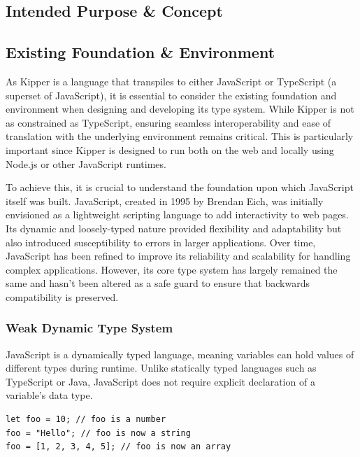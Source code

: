 \subsection{Intended Purpose \& Concept}

\subsection{Existing Foundation \& Environment}

As Kipper is a language that transpiles to either JavaScript or TypeScript (a superset of JavaScript), it is essential to consider the existing foundation and environment when designing and developing its type system. While Kipper is not as constrained as TypeScript, ensuring seamless interoperability and ease of translation with the underlying environment remains critical. This is particularly important since Kipper is designed to run both on the web and locally using Node.js or other JavaScript runtimes.

To achieve this, it is crucial to understand the foundation upon which JavaScript itself was built. JavaScript, created in 1995 by Brendan Eich, was initially envisioned as a lightweight scripting language to add interactivity to web pages. Its dynamic and loosely-typed nature provided flexibility and adaptability but also introduced susceptibility to errors in larger applications. Over time, JavaScript has been refined to improve its reliability and scalability for handling complex applications. However, its core type system has largely remained the same and hasn't been altered as a safe guard to ensure that backwards compatibility is preserved.

\subsubsection{Weak Dynamic Type System}

JavaScript is a dynamically typed language, meaning variables can hold values of different types during runtime. Unlike statically typed languages such as TypeScript or Java, JavaScript does not require explicit declaration of a variable's data type.

\begin{lstlisting}[caption=Holding Values of different Types during Runtime]
let foo = 10; // foo is a number
foo = "Hello"; // foo is now a string
foo = [1, 2, 3, 4, 5]; // foo is now an array
\end{lstlisting}

